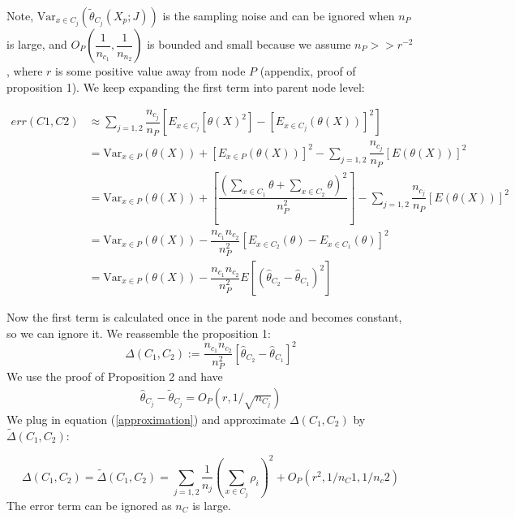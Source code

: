 \documentclass[12pt,letterpaper]{article}
\newcommand{\var}{\mathrm{Var }}
\begin{document}
Note, $  \var_{x \in C_{j}}(\tilde{\theta}_{C_j}(X_{p};J)) $ is the sampling noise and can be ignored when $ n_P $ is large, and $ O_P(\dfrac{1}{n_{c_1}}, \dfrac{1}{n_{n_2}}) $ is bounded and small because we assume $ n_P >> r^{-2} $, where $ r $ is some positive value away from node $ P $ (appendix, proof of proposition 1). We keep expanding the first term into parent node level:

\begin{equation}
	\begin{aligned}\label{key}
		err(C1, C2) & \approx \sum\limits_{j=1,2} \dfrac{n_{c_j}}{n_{P}}[ E_{x\in C_j}[\theta(X)^2] - [E_{x\in C_j}(\theta(X))]^2  ] \\
		& = \var_{x\in P}(\theta(X)) +  [E_{x \in P} (\theta(X))]^2 - \sum\limits_{j=1,2}\dfrac{n_{c_j}}{n_{P}}[E(\theta(X))]^2 \\
		& = \var_{x\in P}(\theta(X)) +  [\dfrac{(\sum_{x \in C_1}\theta + \sum_{x \in C_2}\theta)^2}{n_{P}^2} ] - \sum\limits_{j=1,2}\dfrac{n_{c_j}}{n_{P}}[E(\theta(X))]^2 \\
		& =  \var_{x\in P}(\theta(X)) - \dfrac{n_{c_1}n_{c_2}}{n_{P}^2} [ E_{x\in C_2}(\theta) - E_{x \in C_1}(\theta)]^2 \\
		& = \var_{x\in P}(\theta(X)) - \dfrac{n_{c_1}n_{c_2}}{n_{P}^2} E[ (\hat{\theta}_{C_2} - \hat{\theta}_{C_1})^2]
	\end{aligned}
\end{equation}

Now the first term is calculated once in the parent node and becomes constant, so we can ignore it. We reassemble the proposition 1:
\begin{equation}\label{key}
 \Delta(C_1, C_2)	:= \dfrac{n_{c_1}n_{c_2}}{n_{P}^2} [ \hat{\theta}_{C_2} - \hat{\theta}_{C_1} ]^2
\end{equation}
We use the proof of Proposition 2 and have 
\begin{align}\label{key}
	\hat{\theta}_{C_j} - \tilde{\theta}_{C_j} = O_P(r, 1/\sqrt{n_{C_j}}) 
\end{align}
We plug in equation (\ref{approximation}) and approximate $ \Delta(C_1, C_2) $ by $ \tilde{\Delta}(C_1, C_2) $:

\begin{equation}\label{splitting}
	 \Delta(C_1, C_2) = \tilde{\Delta}(C_1, C_2) = \sum\limits_{j=1,2} \dfrac{1}{n_j}( \sum\limits_{x \in C_j} \rho_{i}  )^2 + O_P(r^2, 1/n_C1, 1/n_c2)
\end{equation}
The error term can be ignored as $ n_C $ is large. 
\end{document}
